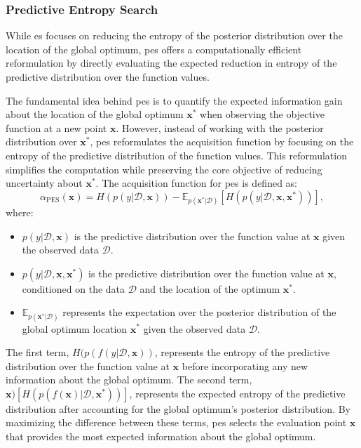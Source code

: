 \subsubsection{Predictive Entropy Search}
While \ac{es} focuses on reducing the entropy of the posterior distribution over the location of the global optimum, \acf{pes} offers a computationally efficient reformulation by directly evaluating the expected reduction in entropy of the predictive distribution over the function values.

The fundamental idea behind \ac{pes} is to quantify the expected information gain about the location of the global optimum $\mathbf{x}^*$ when observing the objective function at a new point $\mathbf{x}$. However, instead of working with the posterior distribution over $\mathbf{x}^*$, \ac{pes} reformulates the acquisition function by focusing on the entropy of the predictive distribution of the function values. This reformulation simplifies the computation while preserving the core objective of reducing uncertainty about $\mathbf{x}^*$. The acquisition function for \ac{pes} is defined as:
\begin{equation*}
    \alpha_{\text{PES}}(\mathbf{x}) = H(p(y \vert \mathcal{D}, \mathbf{x})) - \mathbb{E}_{p(\mathbf{x}^* \vert \mathcal{D})} \left[ H(p(y \vert \mathcal{D}, \mathbf{x}, \mathbf{x}^*)) \right],
\end{equation*}
where:
\begin{itemize}
    \item $p(y \vert \mathcal{D}, \mathbf{x})$ is the predictive distribution over the function value at $\mathbf{x}$ given the observed data $\mathcal{D}$.
    \item $p(y \vert \mathcal{D}, \mathbf{x}, \mathbf{x}^*)$ is the predictive distribution over the function value at $\mathbf{x}$, conditioned on the data $\mathcal{D}$ and the location of the optimum $\mathbf{x}^*$.
    \item $\mathbb{E}_{p(\mathbf{x}^* \vert \mathcal{D})}$ represents the expectation over the posterior distribution of the global optimum location $\mathbf{x}^*$ given the observed data $\mathcal{D}$.
\end{itemize}

The first term, $H(p(f(y \vert \mathcal{D}, \mathbf{x}))$, represents the entropy of the predictive distribution over the function value at $\mathbf{x}$ before incorporating any new information about the global optimum. The second term, $\mathbf{x}) \left[ H(p(f(\mathbf{x}) \vert \mathcal{D}, \mathbf{x}^*)) \right]$, represents the expected entropy of the predictive distribution after accounting for the global optimum's posterior distribution. By maximizing the difference between these terms, \ac{pes} selects the evaluation point $\mathbf{x}$ that provides the most expected information about the global optimum.

